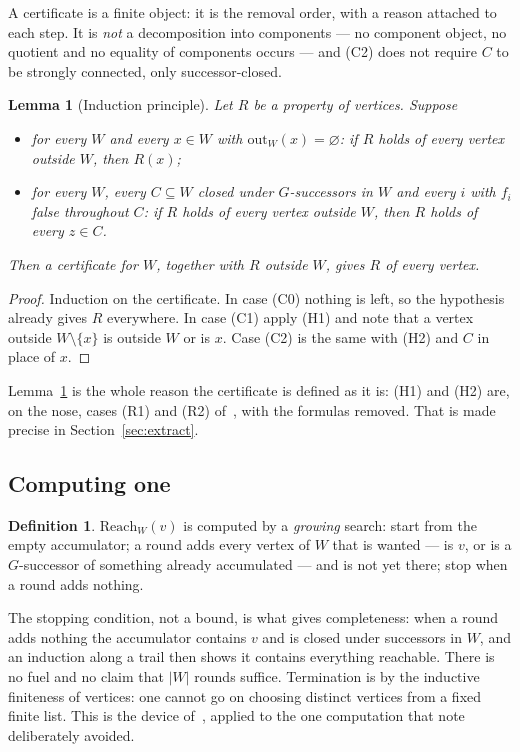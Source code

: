 \documentclass[11pt,a4paper]{article}
\newtheorem{lemma}[theorem]{Lemma}
\theoremstyle{definition}
\newtheorem{definition}[theorem]{Definition}
\newcommand{\Reach}{\mathrm{Reach}}
\newcommand{\outs}{\mathrm{out}}
\begin{document}
A certificate is a finite object: it is the removal order, with a reason
attached to each step.  It is \emph{not} a decomposition into components ---
no component object, no quotient and no equality of components occurs --- and
(C2) does not require $C$ to be strongly connected, only successor-closed.

\begin{lemma}[Induction principle]\label{lem:certall}
Let $R$ be a property of vertices.  Suppose
\begin{itemize}
\item[(H1)] for every $W$ and every $x\in W$ with $\outs_W(x)=\varnothing$: if
  $R$ holds of every vertex outside $W$, then $R(x)$;
\item[(H2)] for every $W$, every $C\subseteq W$ closed under $G$-successors in
  $W$ and every $i$ with $f_i$ false throughout $C$: if $R$ holds of every
  vertex outside $W$, then $R$ holds of every $z\in C$.
\end{itemize}
Then a certificate for $W$, together with $R$ outside $W$, gives $R$ of every
vertex.
\end{lemma}

\begin{proof}
Induction on the certificate.  In case (C0) nothing is left, so the hypothesis
already gives $R$ everywhere.  In case (C1) apply (H1) and note that a vertex
outside $W\setminus\{x\}$ is outside $W$ or is $x$.  Case (C2) is the same with
(H2) and $C$ in place of $x$.
\end{proof}

Lemma~\ref{lem:certall} is the whole reason the certificate is defined as it
is: (H1) and (H2) are, on the nose, cases (R1) and (R2)
of~\cite[Def.~4.1]{m4}, with the formulas removed.  That is made precise in
Section~\ref{sec:extract}.

\subsection*{Computing one}

\begin{definition}\label{def:reach}
$\Reach_W(v)$ is computed by a \emph{growing} search: start from the empty
accumulator; a round adds every vertex of $W$ that is wanted --- is $v$, or is
a $G$-successor of something already accumulated --- and is not yet there; stop
when a round adds nothing.
\end{definition}

The stopping condition, not a bound, is what gives completeness: when a round
adds nothing the accumulator contains $v$ and is closed under successors in
$W$, and an induction along a trail then shows it contains everything reachable.
There is no fuel and no claim that $|W|$ rounds suffice.  Termination is by the
inductive finiteness of vertices: one cannot go on choosing distinct vertices
from a fixed finite list.  This is the device of~\cite[\S4g]{m4}, applied to the
one computation that note deliberately avoided.
\end{document}
